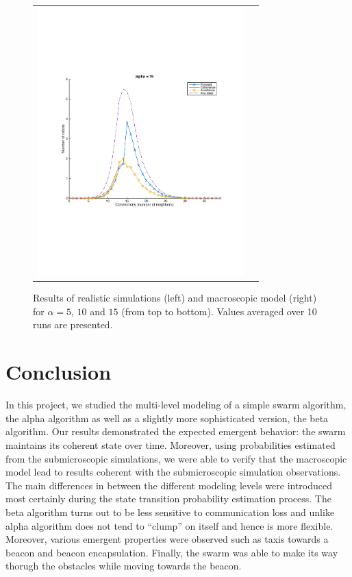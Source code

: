 \documentclass[a4paper, 10pt, conference]{ieeeconf}
\begin{document}
\begin{figure}[p]
\begin{center}
\begin{tabular}{lr}
        \includegraphics[width=8cm]{figures/macroscopic-40-alpha-15.pdf}
      \end{tabular}
      \caption{Results of realistic simulations (left) and macroscopic model (right) for $\alpha = 5$, $10$ and $15$ (from top to bottom). Values averaged over 10 runs are presented.}
      \label{fig:main-results}
    \end{center}
  \end{figure}


\section{Conclusion}
In this project, we studied the multi-level modeling of a simple swarm algorithm, the alpha algorithm as well as a slightly more sophisticated version, the beta algorithm. Our results demonstrated the expected emergent behavior: the swarm maintains its  coherent state over time. Moreover, using probabilities estimated from the submicroscopic simulations, we were able to verify that the macroscopic model lead to results coherent with the submicroscopic simulation observations. The main differences in between the different modeling levels were introduced most certainly during the state transition probability estimation process. The beta algorithm turns out to be less sensitive to communication loss and unlike alpha algorithm does not tend to ``clump'' on itself and hence is more flexible. Moreover, various emergent properties were observed such as taxis towards a beacon and beacon encapsulation. Finally, the swarm was able to make its way thorugh the obstacles while moving towards the beacon.
\end{document}
